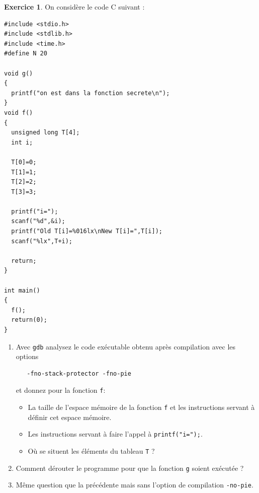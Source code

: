 \documentclass[a4paper,9pt]{article}
\newenvironment{terminal}{\color{black}\begin{snugshade*}}
{\end{snugshade*}\color{black}}
\theoremstyle{plain}
\theoremstyle{definition}
\newtheorem{exercice}{Exercice}
\begin{document}
\begin{exercice}
On considère le code C suivant :
\begin{terminal}
\begin{verbatim}
#include <stdio.h>
#include <stdlib.h>
#include <time.h>
#define N 20

void g()
{
  printf("on est dans la fonction secrete\n");
}
void f()
{
  unsigned long T[4];
  int i;
  
  T[0]=0;
  T[1]=1;
  T[2]=2;
  T[3]=3;

  printf("i=");
  scanf("%d",&i);
  printf("Old T[i]=%016lx\nNew T[i]=",T[i]);  
  scanf("%lx",T+i);
    
  return;
}

int main()
{
  f();
  return(0);
}
\end{verbatim}
\end{terminal}
  \begin{enumerate}
  \item Avec \verb|gdb| analysez le code exécutable obtenu après compilation avec les options
\begin{verbatim}
   -fno-stack-protector -fno-pie
\end{verbatim}
et donnez pour la fonction \verb|f|:
\begin{itemize}
\item La taille de l'espace mémoire de la fonction \verb|f| et les instructions servant à définir cet espace mémoire.
\item Les instructions servant à faire l'appel à \verb|printf("i=");|.
\item Où se situent les éléments du tableau \verb|T| ? 
\end{itemize}
\item Comment dérouter le programme pour que la fonction \verb|g| soient exécutée ? 
\item Même question que la précédente mais sans l'option de compilation \verb|-no-pie|.
  

   \end{enumerate}
\end{exercice}
\end{document}
